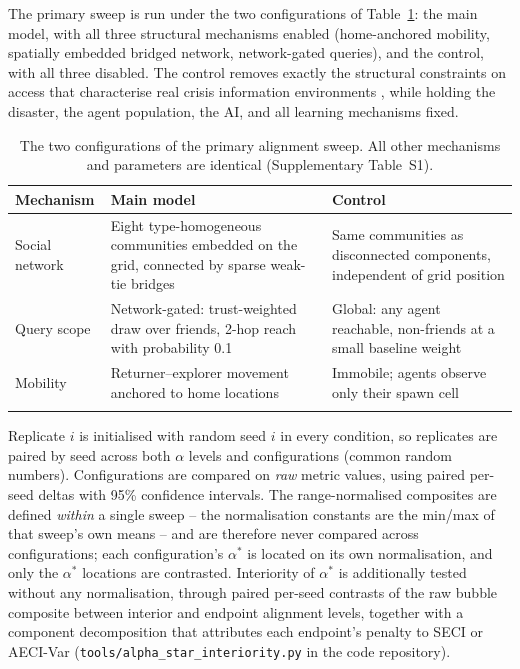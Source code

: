 \documentclass[pdflatex,sn-nature]{sn-jnl}
\begin{document}
The primary sweep is run under the two configurations of Table~\ref{tab:configs}: the main model, with all three structural mechanisms enabled (home-anchored mobility, spatially embedded bridged network, network-gated queries), and the control, with all three disabled. The control removes exactly the structural constraints on access that characterise real crisis information environments \citep{pan2012crisis,holguin2012unique}, while holding the disaster, the agent population, the AI, and all learning mechanisms fixed.

\begin{table}[h]
\caption{The two configurations of the primary alignment sweep. All other mechanisms and parameters are identical (Supplementary Table~S1).}\label{tab:configs}
\begin{tabular}{@{}p{3.2cm}p{4.6cm}p{4.6cm}@{}}
\toprule
Mechanism & Main model & Control \\
\midrule
Social network & Eight type-homogeneous communities embedded on the grid, connected by sparse weak-tie bridges & Same communities as disconnected components, independent of grid position \\
Query scope & Network-gated: trust-weighted draw over friends, 2-hop reach with probability 0.1 & Global: any agent reachable, non-friends at a small baseline weight \\
Mobility & Returner--explorer movement anchored to home locations \citep{pappalardo2015returners} & Immobile; agents observe only their spawn cell \\
\botrule
\end{tabular}
\end{table} Replicate $i$ is initialised with random seed $i$ in every condition, so replicates are paired by seed across both $\alpha$ levels and configurations (common random numbers). Configurations are compared on \emph{raw} metric values, using paired per-seed deltas with 95\% confidence intervals. The range-normalised composites are defined \emph{within} a single sweep -- the normalisation constants are the min/max of that sweep's own means -- and are therefore never compared across configurations; each configuration's $\alpha^{*}$ is located on its own normalisation, and only the $\alpha^{*}$ locations are contrasted. Interiority of $\alpha^{*}$ is additionally tested without any normalisation, through paired per-seed contrasts of the raw bubble composite between interior and endpoint alignment levels, together with a component decomposition that attributes each endpoint's penalty to SECI or AECI-Var (\texttt{tools/alpha\_star\_interiority.py} in the code repository).
\end{document}

